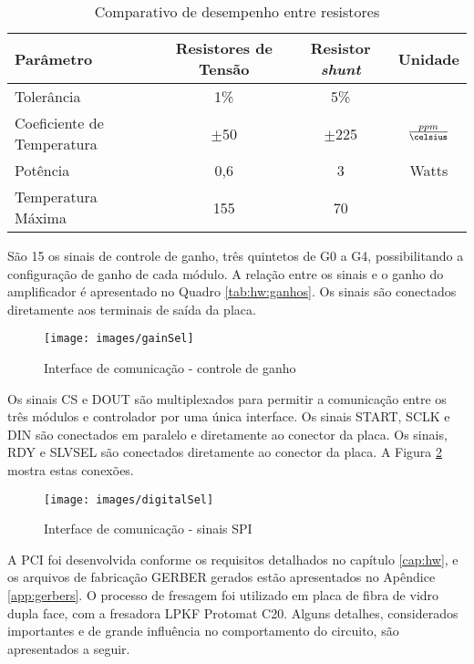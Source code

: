 			\begin{table}
				\caption{Comparativo de desempenho entre resistores}
				\label{tab:proto:resistor}
				\centering
				\begin{tabular}{|l|c|c|c|}
					\hline
					\textbf{Parâmetro}		&	\textbf{Resistores de Tensão}		&	\textbf{Resistor \textit{shunt}}		&	\textbf{Unidade}	\\
					\hline
					Tolerância		&	1\%	&	5\%	&			\\
					\hline
					Coeficiente
					 de Temperatura	&	$\pm$50	&	$\pm$225	&	$\frac{ppm}{\celsius}$	\\
					\hline
					Potência		&	0,6	&	3	&	Watts	\\
					\hline
					Temperatura
					Máxima			&	155	&	70	&	\celsius	\\
					\hline
				\end{tabular}
			\end{table}

			São 15 os sinais de controle de ganho, três quintetos de G0 a G4, possibilitando a configuração de ganho de cada módulo. A relação entre os sinais e o ganho do amplificador é apresentado no Quadro \ref{tab:hw:ganhos}. Os sinais são conectados diretamente aos terminais de saída da placa.

			\begin{figure}
				\caption{Interface de comunicação - controle de ganho}
				\label{img:proto:gains}
				\texttt{[image: images/gainSel]}
			\end{figure}

			Os sinais CS e DOUT são multiplexados para permitir a comunicação entre os três módulos e controlador por uma única interface. Os sinais START, SCLK e DIN são conectados em paralelo e diretamente ao conector da placa. Os sinais, RDY e SLVSEL são conectados diretamente ao conector da placa. A Figura \ref{img:proto:digital} mostra estas conexões.

			\begin{figure}
				\caption{Interface de comunicação - sinais SPI}
				\label{img:proto:digital}
				\texttt{[image: images/digitalSel]}
			\end{figure}

			A PCI foi desenvolvida conforme os requisitos detalhados no capítulo \ref{cap:hw}, e os arquivos de fabricação GERBER gerados estão apresentados no Apêndice \ref{app:gerbers}. O processo de fresagem foi utilizado em placa de fibra de vidro dupla face, com a fresadora LPKF Protomat C20\textsuperscript{\textregistered}. Alguns detalhes, considerados importantes e de grande influência no comportamento do circuito, são apresentados a seguir.

